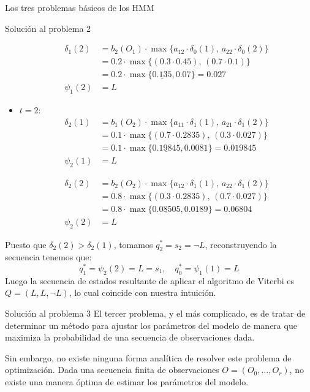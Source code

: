 \begin{section}{Los tres problemas básicos de los HMM}
\begin{subsection}{Solución al problema 2}
\begin{exampleth}
\begin{itemize}
    \[\begin{aligned}
        \delta_1(2)&=b_2(O_1)\cdot\max\{a_{12}\cdot\delta_0(1),\,a_{22}\cdot\delta_0(2)\}\\
        &=0.2\cdot\max\{(0.3\cdot0.45),\,(0.7\cdot0.1)\}\\
        &=0.2\cdot\max\{\underline{0.135},0.07\}=0.027\\
        \psi_1(2)&=L
    \end{aligned}\]
    
    \item $t=2$:
    \[\begin{aligned}
        \delta_2(1)&=b_1(O_2)\cdot\max\{a_{11}\cdot\delta_1(1),\,a_{21}\cdot\delta_1(2)\}\\
        &=0.1\cdot\max\{(0.7\cdot0.2835),\,(0.3\cdot0.027)\}\\
        &=0.1\cdot\max\{\underline{0.19845},0.0081\}=0.019845\\
        \psi_2(1)&=L
    \end{aligned}\]
    
    \[\begin{aligned}
        \delta_2(2)&=b_2(O_2)\cdot\max\{a_{12}\cdot\delta_1(1),\,a_{22}\cdot\delta_1(2)\}\\
        &=0.8\cdot\max\{(0.3\cdot0.2835),\,(0.7\cdot0.027)\}\\
        &=0.8\cdot\max\{\underline{0.08505},0.0189\}=0.06804\\
        \psi_2(2)&=L
    \end{aligned}\]
\end{itemize}
Puesto que $\delta_2(2)>\delta_2(1)$, tomamos $q_2^*=s_2=\neg L$, reconstruyendo la secuencia tenemos que:
\[q_1^*=\psi_2(2)=L=s_1, \quad q_0^*=\psi_1(1)=L\]
Luego la secuencia de estados resultante de aplicar el algoritmo de Viterbi es $Q=(L,L,\neg L)$, lo cual coincide con nuestra intuición.

\end{exampleth}

\end{subsection}

\begin{subsection}{Solución al problema 3}
El tercer problema, y el más complicado, es de tratar de determinar un método para ajustar los parámetros del modelo de manera que maximiza la probabilidad de una secuencia de observaciones dada. 

Sin embargo, no existe ninguna forma analítica de resolver este problema de optimización. Dada una secuencia finita de observaciones $O=(O_0,\dots,O_r)$, no existe una manera óptima de estimar los parámetros del modelo.


\end{subsection}
\end{section}
